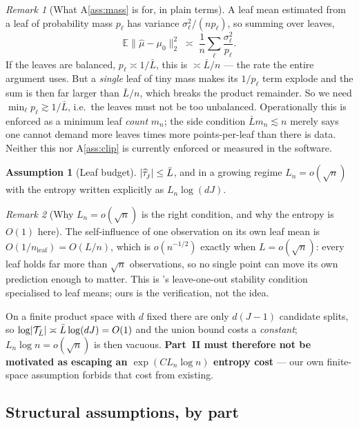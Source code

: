 \documentclass[11pt]{article}
\theoremstyle{plain}
\theoremstyle{definition}
\newtheorem{assumption}{Assumption}
\theoremstyle{remark}
\newtheorem{remark}{Remark}
\newcommand{\E}{\mathbb{E}}
\newcommand{\cT}{\mathcal{T}}
\newcommand{\mz}{\mu_0}
\newcommand{\mhat}{\widehat{\mu}}
\newcommand{\that}{\widehat{\tau}}
\newcommand{\Ltwo}[1]{\lVert #1 \rVert_{2}}
\DeclarePairedDelimiter{\card}{\lvert}{\rvert}
\begin{document}
\begin{remark}[What A\ref{ass:mass} is for, in plain terms]\label{rem:mass}
A leaf mean estimated from a leaf of probability mass $p_\ell$ has variance
$\sigma^2_\ell/(np_\ell)$, so summing over leaves,
\[
  \E\Ltwo{\mhat-\mz}^2 \;\asymp\; \frac1n\sum_{\ell}\frac{\sigma^2_\ell}{p_\ell}.
\]
If the leaves are balanced, $p_\ell\asymp1/\bar L$, this is $\asymp\bar L/n$ ---
the rate the entire argument uses. But a \emph{single} leaf of tiny mass makes
its $1/p_\ell$ term explode and the sum is then far larger than $\bar L/n$,
which breaks the product remainder. So we need $\min_\ell p_\ell\gtrsim1/\bar L$,
i.e.\ the leaves must not be too unbalanced. Operationally this is enforced as a
minimum leaf \emph{count} $m_n$; the side condition $\bar Lm_n\lesssim n$ merely
says one cannot demand more leaves times more points-per-leaf than there is data.
Neither this nor A\ref{ass:clip} is currently enforced or measured in the
software.
\end{remark}

\begin{assumption}[Leaf budget]\label{ass:budget}
$\card{\that_j}\le\bar L$, and in a growing regime $L_n=o(\sqrt n)$ with the
entropy written explicitly as $L_n\log(dJ)$.
\end{assumption}

\begin{remark}[Why $L_n=o(\sqrt n)$ is the right condition, and why the entropy
is $O(1)$ here]\label{rem:selfinfluence}
The self-influence of one observation on its own leaf mean is
$O(1/n_{\mathrm{leaf}})=O(L/n)$, which is $o(n^{-1/2})$ exactly when
$L=o(\sqrt n)$: every leaf holds far more than $\sqrt n$ observations, so no
single point can move its own prediction enough to matter. This is
\citet{chen2022}'s leave-one-out stability condition specialised to leaf means;
ours is the verification, not the idea.

On a finite product space with $d$ fixed there are only $d(J-1)$ candidate
splits, so $\log\card{\cT_{\bar L}}\asymp\bar L\log(dJ)=O(1)$ and the union bound
costs a \emph{constant}; $L_n\log n=o(\sqrt n)$ is then vacuous. \textbf{Part~II
must therefore not be motivated as escaping an $\exp(CL_n\log n)$ entropy cost}
--- our own finite-space assumption forbids that cost from existing.
\end{remark}

\subsection{Structural assumptions, by part}
\end{document}
